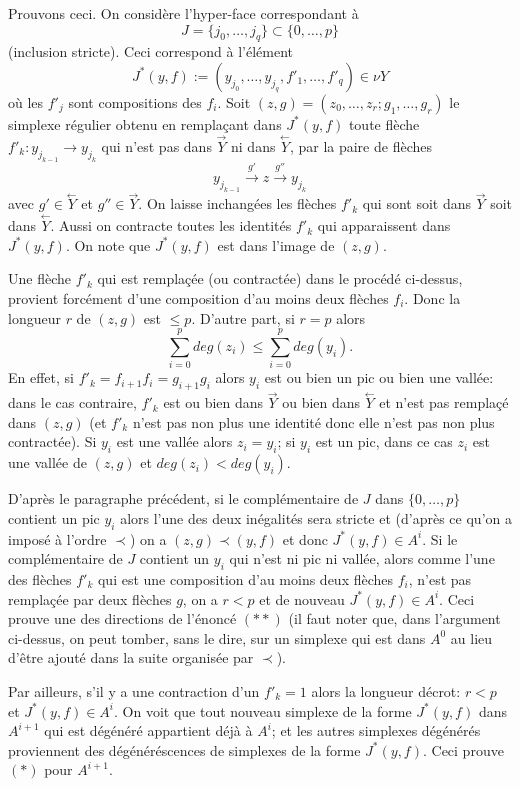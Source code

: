 \documentclass[12pt]{article}
\newcommand{\direct}[1]{\stackrel{\rightarrow}{#1}}
\newcommand{\inverse}[1]{\stackrel{\leftarrow}{#1}}
\begin{document}
Prouvons ceci. On consid\`ere l'hyper-face correspondant \`a
$$
J= \{j_0,\ldots ,
j_q\} \subset \{ 0,\ldots , p\}
$$
(inclusion stricte). Ceci correspond \`a
l'\'el\'ement
$$
J^{\ast}(y,f):=(y_{j_0}, \ldots , y_{j_q}, f'_1,\ldots , f'_q)\in \nu Y
$$
o\`u
les $f'_j$ sont compositions des $f_i$. Soit $(z,g)=(z_0,\ldots , z_r;
g_1,\ldots , g_r)$ le simplexe r\'egulier obtenu en rempla\c{c}ant dans
$J^{\ast}(y,f)$ toute fl\`eche  $f'_k: y_{j_{k-1}}\rightarrow y_{j_k}$ qui n'est
pas dans $\direct{Y}$ ni dans $\inverse{Y}$, par la paire de fl\`eches
$$
y_{j_{k-1}}\stackrel{g'}{\rightarrow}z\stackrel{g''}{\rightarrow} y_{j_k}
$$
avec $g'\in \inverse{Y}$ et $g''\in \direct{Y}$.
On laisse inchang\'ees les
fl\`eches $f'_k$ qui sont soit dans $\direct{Y}$ soit dans
$\inverse{Y}$.
Aussi on contracte toutes les identit\'es $f'_k$ qui apparaissent dans
$J^{\ast}(y,f)$. On note que $J^{\ast}(y,f)$ est dans l'image de $(z,g)$.

Une fl\`eche $f'_k$ qui est rempla\c{c}\'ee (ou contract\'ee) dans le
proc\'ed\'e
ci-dessus, provient forc\'ement d'une composition d'au moins deux fl\`eches
$f_i$.  Donc la longueur $r$ de $(z,g)$ est $\leq p$. D'autre part, si $r=p$
alors
$$
\sum _{i=0}^p deg (z_i) \leq \sum _{i=0}^p deg (y_i).
$$
En effet, si $f'_k=f_{i+1}f_i = g_{i+1}g_i$ alors $y_i$ est ou bien un pic
ou bien une vall\'ee: dans le cas contraire, $f'_k$ est ou bien dans
$\direct{Y}$
ou bien dans $\inverse{Y}$ et n'est pas rempla\c{c}\'e dans $(z,g)$ (et $f'_k$
n'est pas non plus une identit\'e donc elle n'est pas non plus contract\'ee).
Si $y_i$ est une vall\'ee alors $z_i=y_i$; si $y_i$ est un pic, dans ce cas
$z_i$ est une vall\'ee de $(z,g)$ et $deg(z_i) < deg (y_i)$.

D'apr\`es le paragraphe pr\'ec\'edent, si le compl\'ementaire de $J$ dans $\{
0,\ldots , p\}$ contient un pic $y_i$ alors l'une des deux
in\'egalit\'es sera stricte et (d'apr\`es ce qu'on a impos\'e \`a l'ordre
$\prec$) on a $(z,g)\prec (y,f)$ et donc $J^{\ast}(y,f)\in A^i$. Si le
compl\'ementaire
de $J$ contient un $y_i$ qui n'est ni pic ni vall\'ee, alors comme l'une des
fl\`eches $f'_k$ qui est une composition d'au moins deux fl\`eches $f_i$, n'est
pas rempla\c{c}\'ee par deux fl\`eches $g$, on a $r<p$ et de nouveau
$J^{\ast}(y,f)\in A^i$.
Ceci prouve une des directions de l'\'enonc\'e $(\ast \ast )$
(il faut noter que, dans l'argument ci-dessus, on peut tomber, sans le
dire, sur un
simplexe qui est dans $A^0$ au lieu d'\^etre ajout\'e dans la suite organis\'ee
par $\prec$).


Par ailleurs, s'il y a une contraction d'un $f'_k= 1$ alors la longueur
d\'ecro\*{\i}t: $ r<p$ et $J^{\ast}(y,f)\in A^i$.  On voit que tout nouveau
simplexe
de la forme $J^{\ast}(y,f)$ dans $A^{i+1}$ qui est d\'eg\'en\'er\'e appartient
d\'ej\`a \`a $A^{i}$; et les autres simplexes d\'eg\'en\'er\'es
proviennent des d\'eg\'en\'er\'escences de simplexes de la forme
$J^{\ast}(y,f)$. Ceci prouve $(\ast )$ pour $A^{i+1}$.
\end{document}
